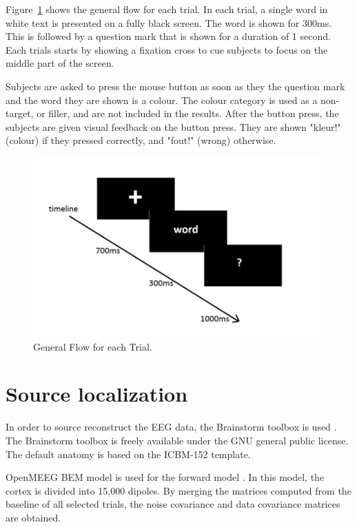 Figure~\ref{experiment} shows the general flow for each trial. In each trial, a single word in white text is presented on a fully black screen. The word is shown for 300ms. This is followed by a question mark that is shown for a duration of 1 second. Each trials starts by showing a fixation cross to cue subjects to focus on the middle part of the screen. 

Subjects are asked to press the mouse button as soon as they the question mark and the word they are shown is a colour. The colour category is used as a non-target, or filler, and are not included in the results. After the button press, the subjects are given visual feedback on the button press. They are shown "kleur!" (colour) if they pressed correctly, and "fout!" (wrong) otherwise.

\begin{figure}[!htb]
\caption{General Flow for each Trial.}
\label{experiment}
    \centering
    \includegraphics[width=\textwidth]{fig/experiment}
\end{figure}

\section{Source localization}

In order to source reconstruct the EEG data, the Brainstorm toolbox is used \cite{tadel2011brainstorm}. The Brainstorm toolbox is freely available under the GNU general public license. The default anatomy is based on the ICBM-152 template.

OpenMEEG BEM model is used for the forward model \cite{gramfort2014mne}. In this model, the cortex is divided into 15,000 dipoles. By merging the matrices computed from the baseline of all selected trials, the noise covariance and data covariance matrices are obtained. 

